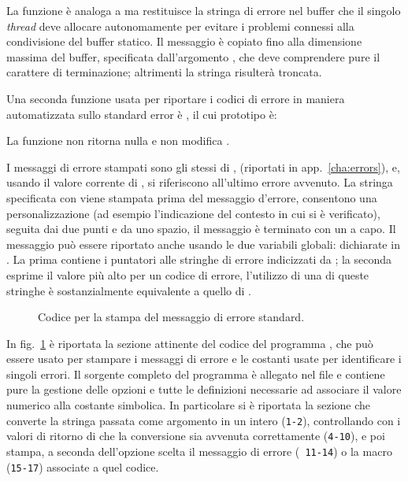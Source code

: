 La funzione è analoga a  ma restituisce la stringa di errore
nel buffer  che il singolo \textit{thread} deve allocare
autonomamente per evitare i problemi connessi alla condivisione del buffer
statico. Il messaggio è copiato fino alla dimensione massima del buffer,
specificata dall'argomento , che deve comprendere pure il
carattere di terminazione; altrimenti la stringa risulterà troncata.

Una seconda funzione usata per riportare i codici di errore in maniera
automatizzata sullo standard error è , il cui prototipo è:

\begin{funcproto}{
}

{La funzione non ritorna nulla e non modifica .}
\end{funcproto}


I messaggi di errore stampati sono gli stessi di , (riportati
in app.~\ref{cha:errors}), e, usando il valore corrente di , si
riferiscono all'ultimo errore avvenuto. La stringa specificata con
 viene stampata prima del messaggio d'errore, consentono una
personalizzazione (ad esempio l'indicazione del contesto in cui si è
verificato), seguita dai due punti e da uno spazio, il messaggio è terminato
con un a capo.  Il messaggio può essere riportato anche usando le due
variabili globali:
dichiarate in . La prima contiene i puntatori alle stringhe
di errore indicizzati da ; la seconda esprime il valore più alto
per un codice di errore, l'utilizzo di una di queste stringhe è
sostanzialmente equivalente a quello di .

\begin{figure}[!htbp]
  \footnotesize \centering
  \begin{minipage}[c]{\codesamplewidth}
  \end{minipage}
  \normalsize
  \caption{Codice per la stampa del messaggio di errore standard.}
  \label{fig:sys_err_mess}
\end{figure}

In fig.~\ref{fig:sys_err_mess} è riportata la sezione attinente del codice del
programma , che può essere usato per stampare i messaggi di
errore e le costanti usate per identificare i singoli errori. Il sorgente
completo del programma è allegato nel file  e contiene pure la
gestione delle opzioni e tutte le definizioni necessarie ad associare il
valore numerico alla costante simbolica. In particolare si è riportata la
sezione che converte la stringa passata come argomento in un intero
(\texttt{\small 1-2}), controllando con i valori di ritorno di 
che la conversione sia avvenuta correttamente (\texttt{\small 4-10}), e poi
stampa, a seconda dell'opzione scelta il messaggio di errore (\texttt{\small
  11-14}) o la macro (\texttt{\small 15-17}) associate a quel codice.



